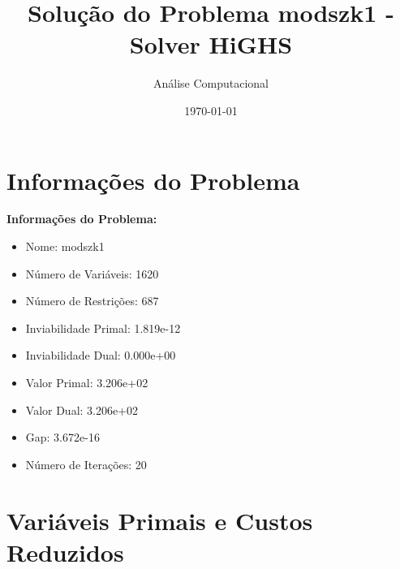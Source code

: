 \documentclass[12pt]{article}
\title{Solução do Problema modszk1 - Solver HiGHS}
\author{Análise Computacional}
\date{\today}
\begin{document}
\maketitle

\section{Informações do Problema}

\textbf{Informações do Problema:}
\begin{itemize}
\item Nome: modszk1
\item Número de Variáveis: 1620
\item Número de Restrições: 687
\item Inviabilidade Primal: 1.819e-12
\item Inviabilidade Dual: 0.000e+00
\item Valor Primal: 3.206e+02
\item Valor Dual: 3.206e+02
\item Gap: 3.672e-16
\item Número de Iterações: 20
\end{itemize}


\section{Variáveis Primais e Custos Reduzidos}
\end{document}
